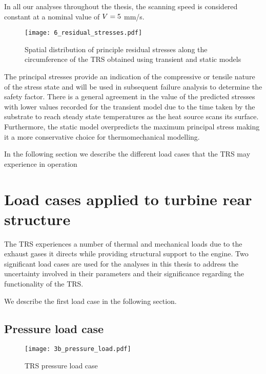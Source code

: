 In all our analyses throughout the thesis, the scanning speed is considered constant at a nominal value of ${\color{black} V} = 5$ mm/s.

\begin{figure}[h!]
	\centering
	\texttt{[image: 6\_residual\_stresses.pdf]}
	\caption{ \label{fig:Sprinciple} Spatial distribution of principle residual stresses along the circumference of the \ac{TRS} obtained using transient and static models}
\end{figure}

The principal stresses provide an indication of the compressive or tensile nature of the stress state and will be used in subsequent failure analysis to determine the safety factor. There is a general agreement in the value of the predicted stresses with lower values recorded for the transient model due to the time taken by the substrate to reach steady state temperatures as the heat source scans its surface. Furthermore, the static model overpredicts the maximum principal stress making it a more conservative choice for thermomechanical modelling.

In the following section we describe the different load cases that the \ac{TRS} may experience in operation

\section{Load cases applied to turbine rear structure}
\label{sec:loadcases}

The \ac{TRS} experiences a number of thermal and mechanical loads due to the exhaust gases it directs while providing structural support to the engine. Two significant load cases are used for the analyses in this thesis to address the uncertainty involved in their parameters and their significance regarding the functionality of the \ac{TRS}.

We describe the first load case in the following section.

\subsection{Pressure load case} \label{subsec:iploadcase}

\begin{figure}[h!]
    \centering
    \texttt{[image: 3b\_pressure\_load.pdf]}
    \caption{ \label{fig:ipload} \ac{TRS} pressure load case }
\end{figure}

